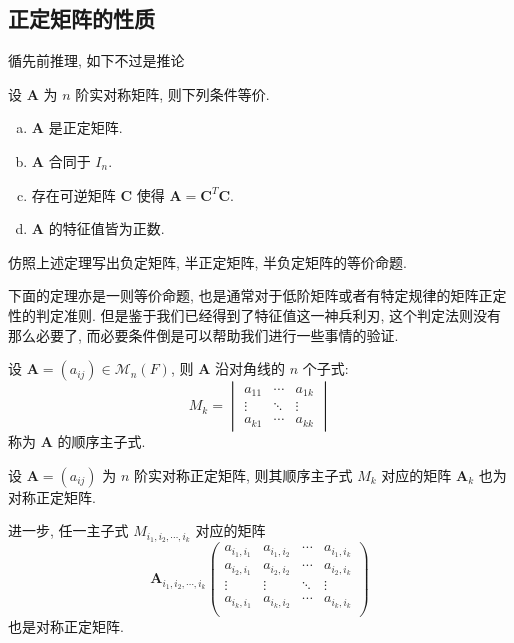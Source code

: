 \documentclass[UTF8]{book}
\begin{document}
\subsection{正定矩阵的性质}

循先前推理, 如下不过是推论

\begin{theorem}
    设 $\boldsymbol{A}$ 为 $n$ 阶实对称矩阵, 则下列条件等价. 
    \begin{enumerate}[(a)]
        \item $\boldsymbol{A}$ 是正定矩阵. 
        \item $\boldsymbol{A}$ 合同于 $I_n$. 
        \item 存在可逆矩阵 $\boldsymbol{C}$ 使得 
        $\boldsymbol{A} = \boldsymbol{C}^T\boldsymbol{C}$. 
        \item $\boldsymbol{A}$ 的特征值皆为正数. 
    \end{enumerate}
\end{theorem}

\begin{exercise}
    仿照上述定理写出负定矩阵, 半正定矩阵, 半负定矩阵的等价命题. 
\end{exercise}

下面的定理亦是一则等价命题, 
也是通常对于低阶矩阵或者有特定规律的矩阵正定性的判定准则. 
但是鉴于我们已经得到了特征值这一神兵利刃, 这个判定法则没有那么必要了, 
而必要条件倒是可以帮助我们进行一些事情的验证. 

\begin{definition}
    设 $\boldsymbol{A} = (a_{ij}) \in \mathcal{M}_n(F)$, 
    则 $\boldsymbol{A}$ 沿对角线的 $n$ 个子式:
    $$
    M_k = 
    \begin{vmatrix}
        a_{11} & \cdots & a_{1k} \\
        \vdots & \ddots & \vdots \\
        a_{k1} & \cdots & a_{kk}
    \end{vmatrix}
    $$
    称为 $\boldsymbol{A}$ 的顺序主子式. 
\end{definition}

\begin{proposition}
    设 $\boldsymbol{A}=(a_{ij})$ 为 $n$ 阶实对称正定矩阵, 
    则其顺序主子式 $M_k$ 对应的矩阵 $\boldsymbol{A}_k$ 
    也为对称正定矩阵. 

    进一步, 任一主子式 $M_{i_1,i_2,\cdots,i_k}$ 对应的矩阵 
    $$
    \boldsymbol{A}_{i_1,i_2,\cdots,i_k}
    \begin{pmatrix}
        a_{i_1,i_1} & a_{i_1,i_2} & \cdots & a_{i_1,i_k} \\
        a_{i_2,i_1} & a_{i_2,i_2} & \cdots & a_{i_2,i_k} \\
        \vdots & \vdots & \ddots & \vdots \\
        a_{i_k,i_1} & a_{i_k,i_2} & \cdots & a_{i_k,i_k} \\
    \end{pmatrix}
    $$
    也是对称正定矩阵. 
\end{proposition}
\end{document}
